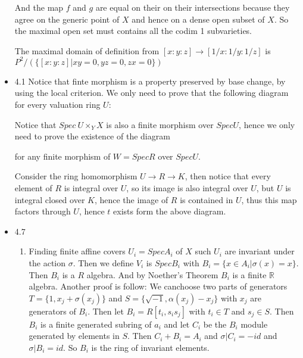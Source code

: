 \documentclass[10pt,letterpaper]{article}
\newcommand{\R}{\mathbb{R}}
\theoremstyle{plain}
\theoremstyle{definition}
\theoremstyle{remark}
\begin{document}
\begin{itemize}
And the map $f$ and $g$ are equal on their on their intersections because they agree on the generic point of $X$ and hence on a dense open subset of $X$. So the maximal open set must contains all the codim 1 subvarieties.

The maximal domain of definition from $[x:y:z] \to [1/x:1/y:1/z]$ is $P^{2}/(\{[x:y:z]|xy=0, yz=0, zx=0\})$
\item 4.1 Notice that finte morphism is a property preserved by base change, by using the local criterion. We only need to prove that the following diagram for every valuation ring $U$:


Notice that $Spec \ U \times_{Y} X$ is also a finite morphism over $Spec U$, hence we only need to prove the existence of the diagram 


for any finite morphism of $W= Spec R$ over $Spec U$. 

Consider the ring homomorphism $U\to R \to K$, then notice that every element of $R$ is integral over $U$, so its image is also integral over $U$, but $U$ is integral closed over $K$, hence the image of $R$ is contained in $U$, thus this map factors through $U$, hence $t$ exists form the above diagram. 

\item 4.7
  \begin{enumerate}
  \item Finding finite affine covers $U_{i}=Spec A_{i}$ of $X$ such $U_{i}$ are invariant under the action $\sigma$. Then we define $V_{i}$ is $Spec B_{i}$ with $B_{i}=\{x\in A_{i}|\sigma(x)=x\}$. Then $B_{i}$ is a $R$ algebra. And by Noether's Theorem $B_{i}$ is a finite $\R$ algebra. Another proof is follow: We canchoose two parts of generators $T=\{1, x_{j}+\sigma(x_{j})\}$ and $S=\{\sqrt{-1},\alpha(x_{j})-x_{j}\}$ with $x_{j}$ are generators of $B_{i}$. Then let $B_{i}= R[t_{i},s_{i}s_{j}]$ with $t_{i}\in T$ and $s_{j} \in S$. Then $B_{i}$ is a finite generated subring of $a_{i}$ and let $C_{i}$ be the $B_{i}$ module generated by elements in $S$. Then $C_{i}+B_{i}=A_{i}$ and $\sigma|C_{i}=-id$ and $\sigma|B_{i}=id$. So $B_{i}$ is the ring of invariant elements.


\end{enumerate}
\end{itemize}
\end{document}
